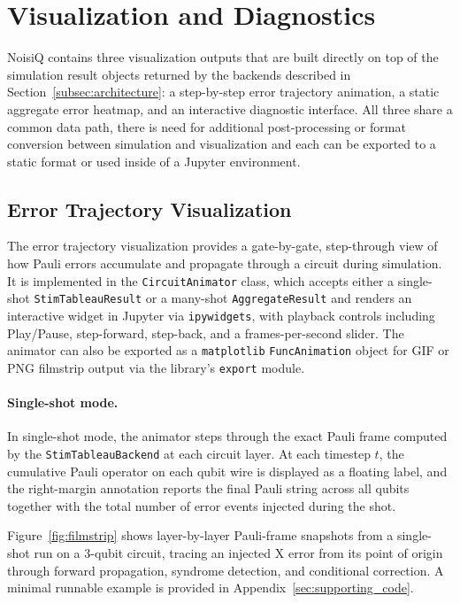 \documentclass[10pt,twocolumn]{article}
\begin{document}
\section{Visualization and Diagnostics}
\label{sec:frontend}

NoisiQ contains three visualization outputs that are built
directly on top of the simulation result objects returned by the backends
described in Section~\ref{subsec:architecture}: a step-by-step error
trajectory animation, a static aggregate error heatmap, and an
interactive diagnostic interface.
All three share a common data path, there is  need for additional post-processing or
format conversion between simulation and visualization
and each can be exported to a static format or
used inside of a Jupyter environment.

\subsection{Error Trajectory Visualization}
\label{subsec:animation}

The error trajectory visualization provides a gate-by-gate,
step-through view of how Pauli errors accumulate and propagate through
a circuit during simulation.
It is implemented in the \texttt{CircuitAnimator} class, which accepts
either a single-shot \texttt{StimTableauResult} or a many-shot
\texttt{AggregateResult} and renders an interactive widget in Jupyter
via \texttt{ipywidgets}, with playback controls including Play/Pause,
step-forward, step-back, and a frames-per-second slider.
The animator can also be exported as a \texttt{matplotlib}
\texttt{FuncAnimation} object for GIF or PNG filmstrip output via the
library's \texttt{export} module.

\paragraph{Single-shot mode.}
In single-shot mode, the animator steps through the exact Pauli frame
computed by the \texttt{StimTableauBackend} at each circuit layer.
At each timestep $t$, the cumulative Pauli operator on each qubit wire
is displayed as a floating label, and the right-margin annotation
reports the final Pauli string across all qubits together with the
total number of error events injected during the shot.

Figure~\ref{fig:filmstrip} shows layer-by-layer Pauli-frame snapshots
from a single-shot run on a 3-qubit circuit, tracing an injected X
error from its point of origin through forward propagation, syndrome
detection, and conditional correction.
A minimal runnable example is provided in
Appendix~\ref{sec:supporting_code}.
\end{document}
